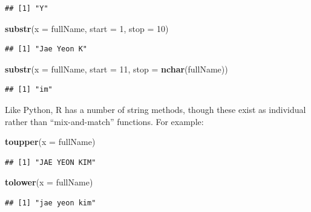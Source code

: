 \documentclass[
]{book}
\newenvironment{Shaded}{\begin{snugshade}}{\end{snugshade}}
\newcommand{\AttributeTok}[1]{\textcolor[rgb]{0.13,0.29,0.53}{#1}}
\newcommand{\DecValTok}[1]{\textcolor[rgb]{0.00,0.00,0.81}{#1}}
\newcommand{\FunctionTok}[1]{\textcolor[rgb]{0.13,0.29,0.53}{\textbf{#1}}}
\newcommand{\NormalTok}[1]{#1}
\begin{document}
\begin{verbatim}
## [1] "Y"
\end{verbatim}

\begin{Shaded}
\begin{Highlighting}[]
\FunctionTok{substr}\NormalTok{(}\AttributeTok{x =}\NormalTok{ fullName, }\AttributeTok{start =} \DecValTok{1}\NormalTok{, }\AttributeTok{stop =} \DecValTok{10}\NormalTok{)}
\end{Highlighting}
\end{Shaded}

\begin{verbatim}
## [1] "Jae Yeon K"
\end{verbatim}

\begin{Shaded}
\begin{Highlighting}[]
\FunctionTok{substr}\NormalTok{(}\AttributeTok{x =}\NormalTok{ fullName, }\AttributeTok{start =} \DecValTok{11}\NormalTok{, }\AttributeTok{stop =} \FunctionTok{nchar}\NormalTok{(fullName))}
\end{Highlighting}
\end{Shaded}

\begin{verbatim}
## [1] "im"
\end{verbatim}

Like Python, R has a number of string methods, though these exist as individual rather than ``mix-and-match'' functions. For example:

\begin{Shaded}
\begin{Highlighting}[]
\FunctionTok{toupper}\NormalTok{(}\AttributeTok{x =}\NormalTok{ fullName)}
\end{Highlighting}
\end{Shaded}

\begin{verbatim}
## [1] "JAE YEON KIM"
\end{verbatim}

\begin{Shaded}
\begin{Highlighting}[]
\FunctionTok{tolower}\NormalTok{(}\AttributeTok{x =}\NormalTok{ fullName)}
\end{Highlighting}
\end{Shaded}

\begin{verbatim}
## [1] "jae yeon kim"
\end{verbatim}
\end{document}
